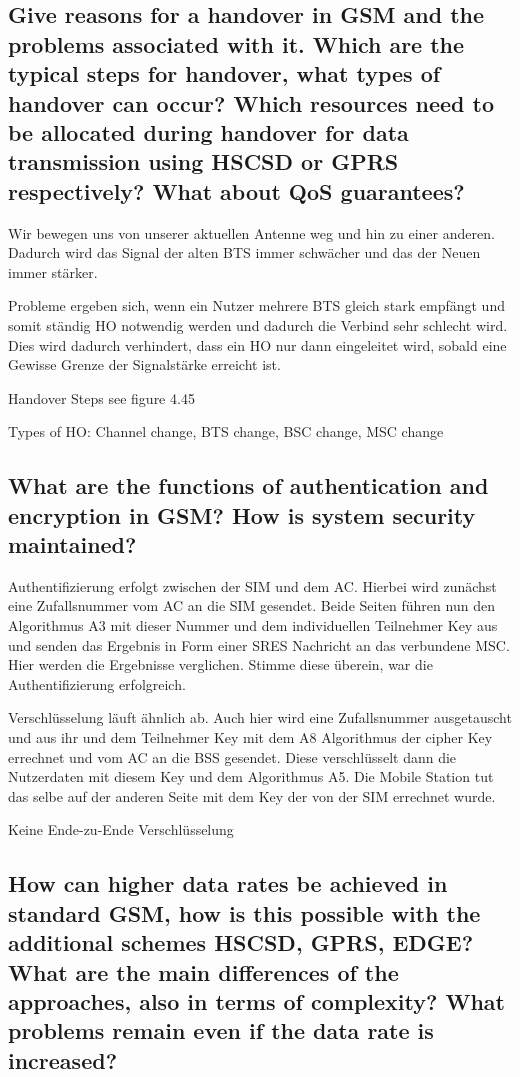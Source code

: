 \subsection{Give reasons for a handover in GSM and the problems associated with it. Which are the typical steps for handover, what types of handover can occur? Which resources need to be allocated during handover for data transmission using HSCSD or GPRS respectively? What about QoS guarantees?}
Wir bewegen uns von unserer aktuellen Antenne weg und hin zu einer anderen. Dadurch wird das Signal der alten BTS immer schwächer und das der Neuen immer stärker.


Probleme ergeben sich, wenn ein Nutzer mehrere BTS gleich stark empfängt und somit ständig HO notwendig werden und dadurch die Verbind sehr schlecht wird. Dies wird dadurch verhindert, dass ein HO nur dann eingeleitet wird, sobald eine Gewisse Grenze der Signalstärke erreicht ist.


Handover Steps see figure 4.45


Types of HO: Channel change, BTS change, BSC change, MSC change

\subsection{What are the functions of authentication and encryption in GSM? How is system security maintained?}
Authentifizierung erfolgt zwischen der SIM und dem AC. Hierbei wird zunächst eine Zufallsnummer vom AC an die SIM gesendet. Beide Seiten führen nun den Algorithmus A3 mit dieser Nummer und dem individuellen Teilnehmer Key aus und senden das Ergebnis in Form einer SRES Nachricht an das verbundene MSC. Hier werden die Ergebnisse verglichen. Stimme diese überein, war die Authentifizierung erfolgreich.

Verschlüsselung läuft ähnlich ab. Auch hier wird eine Zufallsnummer ausgetauscht und aus ihr und dem Teilnehmer Key mit dem A8 Algorithmus der cipher Key errechnet und vom AC an die BSS gesendet. Diese verschlüsselt dann die Nutzerdaten mit diesem Key und dem Algorithmus A5. Die Mobile Station tut das selbe auf der anderen Seite mit dem Key der von der SIM errechnet wurde.

Keine Ende-zu-Ende Verschlüsselung 

\subsection{How can higher data rates be achieved in standard GSM, how is this possible with the additional schemes HSCSD, GPRS, EDGE? What are the main differences of the approaches, also in terms of complexity? What problems remain even if the data rate is increased?}

